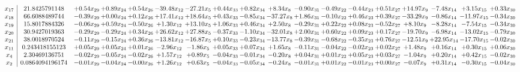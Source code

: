 \documentclass[9pt]{article}
\begin{document}
 \[\begin{array}{c| c c@{\hskip 2pt} c@{\hskip 2pt} c@{\hskip 2pt} c@{\hskip 2pt} c@{\hskip 2pt} c@{\hskip 2pt} c@{\hskip 2pt} c@{\hskip 2pt} c@{\hskip 2pt} c@{\hskip 2pt} c@{\hskip 2pt} c@{\hskip 2pt} c@{\hskip 2pt} c@{\hskip 2pt} c@{\hskip 2pt} c@{\hskip 2pt} }
 x_{17}   &  21.8425791148 & +  0.54 x_{29} & +  0.89 x_{24} & +  0.54 x_{26} & -39.48 x_{12} & -27.21 x_{5} & +  0.44 x_{33} & +  0.82 x_{34} & +  8.34 x_{8} & -0.90 x_{31} & -0.49 x_{22} & -0.44 x_{23} & +  0.51 x_{27} & + 14.97 x_{9} & -7.48 x_{14} & +  3.15 x_{15} & +  0.33 x_{30}\\
 x_{18}   &  66.6088489744 & -0.39 x_{29} & +  0.00 x_{24} & +  0.12 x_{26} & + 17.41 x_{12} & + 18.64 x_{5} & +  0.43 x_{33} & -0.85 x_{34} & -37.27 x_{8} & +  1.86 x_{31} & -0.10 x_{22} & +  0.46 x_{23} & +  0.39 x_{27} & -33.29 x_{9} & -0.86 x_{14} & -11.97 x_{15} & -0.34 x_{30}\\
 x_{19}   &  15.8017884326 & -0.06 x_{29} & +  0.59 x_{24} & -0.50 x_{26} & +  1.30 x_{12} & + 13.10 x_{5} & +  1.06 x_{33} & +  0.46 x_{34} & +  2.50 x_{8} & -0.29 x_{31} & +  0.22 x_{22} & +  0.08 x_{23} & -0.52 x_{27} & +  8.10 x_{9} & -8.28 x_{14} & -7.54 x_{15} & -0.34 x_{30}\\
 x_{20}   &  30.9427019363 & -0.29 x_{29} & -0.29 x_{24} & +  0.34 x_{26} & + 26.62 x_{12} & + 27.88 x_{5} & -0.37 x_{33} & -1.10 x_{34} & -32.01 x_{8} & +  2.00 x_{31} & +  0.60 x_{22} & +  0.09 x_{23} & +  0.17 x_{27} & -19.70 x_{9} & -6.98 x_{14} & -13.02 x_{15} & -0.79 x_{30}\\
 x_{21}   &  38.0018970524 & -0.11 x_{29} & -0.15 x_{24} & +  0.36 x_{26} & -13.81 x_{12} & -16.87 x_{5} & +  0.10 x_{33} & -0.23 x_{34} & -13.77 x_{8} & -0.39 x_{31} & -0.68 x_{22} & -0.35 x_{23} & +  0.76 x_{27} & -12.51 x_{9} & + 22.95 x_{14} & -17.70 x_{15} & -0.02 x_{30}\\
 x_{11}   &  0.243418155123 & +  0.05 x_{29} & +  0.05 x_{24} & +  0.01 x_{26} & -2.96 x_{12} & -1.86 x_{5} & +  0.05 x_{33} & +  0.07 x_{34} & +  1.65 x_{8} & -0.11 x_{31} & -0.04 x_{22} & -0.02 x_{23} & +  0.02 x_{27} & +  1.48 x_{9} & +  0.16 x_{14} & +  0.30 x_{15} & +  0.06 x_{30}\\
 x_{4}   &  2.30469136751 & -0.02 x_{29} & -0.05 x_{24} & -0.02 x_{26} & +  1.57 x_{12} & +  0.89 x_{5} & -0.04 x_{33} & -0.01 x_{34} & -0.20 x_{8} & +  0.04 x_{31} & +  0.01 x_{22} & +  0.05 x_{23} & +  0.03 x_{27} & -1.04 x_{9} & +  0.20 x_{14} & +  0.42 x_{15} & -0.02 x_{30}\\
 x_{2}   &  0.0864094196174 & -0.01 x_{29} & -0.04 x_{24} & -0.00 x_{26} & +  1.26 x_{12} & +  0.63 x_{5} & -0.04 x_{33} & -0.05 x_{34} & -0.24 x_{8} & -0.01 x_{31} & +  0.01 x_{22} & -0.01 x_{23} & +  0.00 x_{27} & -0.07 x_{9} & +  0.31 x_{14} & -0.30 x_{15} & -0.04 x_{30}\\

\end{array}\]
\end{document}
